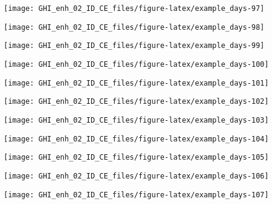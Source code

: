 \documentclass[
  10pt,
  a4paper,oneside]{article}
\begin{document}
\begin{center}\texttt{[image: GHI\_enh\_02\_ID\_CE\_files/figure-latex/example\_days-97]} \end{center}

\begin{center}\texttt{[image: GHI\_enh\_02\_ID\_CE\_files/figure-latex/example\_days-98]} \end{center}

\begin{center}\texttt{[image: GHI\_enh\_02\_ID\_CE\_files/figure-latex/example\_days-99]} \end{center}

\begin{center}\texttt{[image: GHI\_enh\_02\_ID\_CE\_files/figure-latex/example\_days-100]} \end{center}

\begin{center}\texttt{[image: GHI\_enh\_02\_ID\_CE\_files/figure-latex/example\_days-101]} \end{center}

\begin{center}\texttt{[image: GHI\_enh\_02\_ID\_CE\_files/figure-latex/example\_days-102]} \end{center}

\begin{center}\texttt{[image: GHI\_enh\_02\_ID\_CE\_files/figure-latex/example\_days-103]} \end{center}

\begin{center}\texttt{[image: GHI\_enh\_02\_ID\_CE\_files/figure-latex/example\_days-104]} \end{center}

\begin{center}\texttt{[image: GHI\_enh\_02\_ID\_CE\_files/figure-latex/example\_days-105]} \end{center}

\begin{center}\texttt{[image: GHI\_enh\_02\_ID\_CE\_files/figure-latex/example\_days-106]} \end{center}

\begin{center}\texttt{[image: GHI\_enh\_02\_ID\_CE\_files/figure-latex/example\_days-107]} \end{center}
\end{document}
